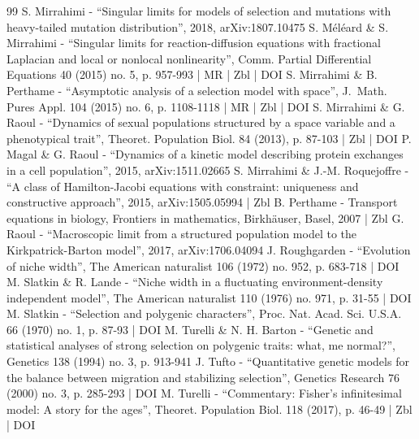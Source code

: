 \begin{thebibliography}{99}
S. Mirrahimi - “Singular limits for models of selection and mutations with heavy-tailed mutation distribution”, 2018, arXiv:1807.10475
S. Méléard \& S. Mirrahimi - “Singular limits for reaction-diffusion equations with fractional Laplacian and local or nonlocal nonlinearity”, Comm. Partial Differential Equations 40 (2015) no. 5, p. 957-993 | MR | Zbl | DOI
S. Mirrahimi \& B. Perthame - “Asymptotic analysis of a selection model with space”, J. Math. Pures Appl. 104 (2015) no. 6, p. 1108-1118 | MR | Zbl | DOI
S. Mirrahimi \& G. Raoul - “Dynamics of sexual populations structured by a space variable and a phenotypical trait”, Theoret. Population Biol. 84 (2013), p. 87-103 | Zbl | DOI
P. Magal \& G. Raoul - “Dynamics of a kinetic model describing protein exchanges in a cell population”, 2015, arXiv:1511.02665
S. Mirrahimi \& J.-M. Roquejoffre - “A class of Hamilton-Jacobi equations with constraint: uniqueness and constructive approach”, 2015, arXiv:1505.05994 | Zbl
B. Perthame - Transport equations in biology, Frontiers in mathematics, Birkhäuser, Basel, 2007 | Zbl
G. Raoul - “Macroscopic limit from a structured population model to the Kirkpatrick-Barton model”, 2017, arXiv:1706.04094
J. Roughgarden - “Evolution of niche width”, The American naturalist 106 (1972) no. 952, p. 683-718 | DOI
M. Slatkin \& R. Lande - “Niche width in a fluctuating environment-density independent model”, The American naturalist 110 (1976) no. 971, p. 31-55 | DOI
M. Slatkin - “Selection and polygenic characters”, Proc. Nat. Acad. Sci. U.S.A. 66 (1970) no. 1, p. 87-93 | DOI
M. Turelli \& N. H. Barton - “Genetic and statistical analyses of strong selection on polygenic traits: what, me normal?”, Genetics 138 (1994) no. 3, p. 913-941
J. Tufto - “Quantitative genetic models for the balance between migration and stabilizing selection”, Genetics Research 76 (2000) no. 3, p. 285-293 | DOI
M. Turelli - “Commentary: Fisher’s infinitesimal model: A story for the ages”, Theoret. Population Biol. 118 (2017), p. 46-49 | Zbl | DOI
\end{thebibliography}
